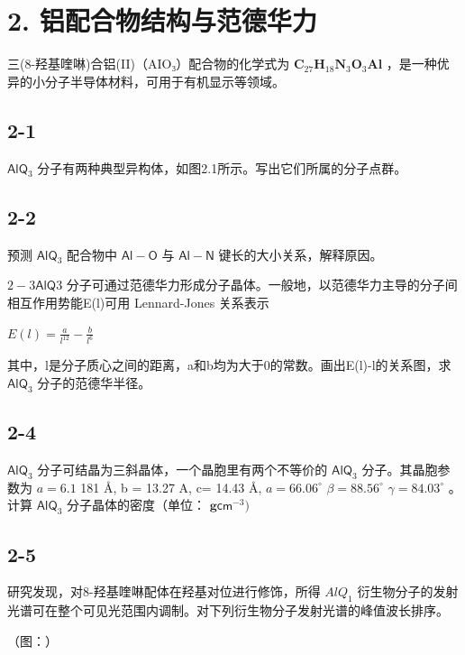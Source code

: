 \section*{2. 铝配合物结构与范德华力}
三(8-羟基喹啉)合铝(II)（AIO₃）配合物的化学式为 $\mathbf { C } _ { 2 7 } \mathbf { H } _ { 1 8 } \mathbf { N } _ { 3 } \mathbf { O } _ { 3 } \mathbf { A } \mathbf { l }$ ，是一种优异的小分子半导体材料，可用于有机显示等领域。

\subsection*{2-1}
$\mathsf { A l Q } _ { 3 }$ 分子有两种典型异构体，如图2.1所示。写出它们所属的分子点群。

\subsection*{2-2}
预测 $\mathsf { A l Q } _ { 3 }$ 配合物中 $\mathsf { A l } - \mathsf { O }$ 与 $\mathsf { A l - N }$ 键长的大小关系，解释原因。

$2 - 3 \mathsf { A l Q } 3$ 分子可通过范德华力形成分子晶体。一般地，以范德华力主导的分子间相互作用势能E(l)可用 Lennard-Jones 关系表示

$
E (l) = \frac {a}{l ^ {1 2}} - \frac {b}{l ^ {6}}
$

其中，l是分子质心之间的距离，a和b均为大于0的常数。画出E(l)-l的关系图，求 $\mathsf { A l Q } _ { 3 }$ 分子的范德华半径。

\subsection*{2-4}
$\mathsf { A l Q } _ { 3 }$ 分子可结晶为三斜晶体，一个晶胞里有两个不等价的 $\mathsf { A l Q } _ { 3 }$ 分子。其晶胞参数为 $a = 6 . 1$ 181 Å, b = 13.27 A, c= 14.43 Å, $a = 6 6 . 0 6 ^ { \circ }$ $\beta = 8 8 . 5 6 ^ { \circ }$ $\gamma = 8 4 . 0 3 ^ { \circ }$ 。计算 $\mathsf { A l Q } _ { 3 }$ 分子晶体的密度（单位： $\mathbf { g } \mathsf { c m } ^ { - 3 } )$

\subsection*{2-5}
研究发现，对8-羟基喹啉配体在羟基对位进行修饰，所得 $A l Q _ { 1 }$ 衍生物分子的发射光谱可在整个可见光范围内调制。对下列衍生物分子发射光谱的峰值波长排序。

（图：）
